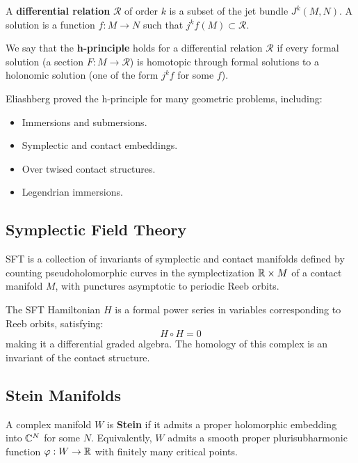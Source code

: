 \begin{definition}
A \textbf{differential relation} $\mathcal{R}$ of order $k$ is a subset of the jet bundle $J^k(M,N)$. A solution is a function $f: M \to N$ such that $j^k f(M) \subset \mathcal{R}$.
\end{definition}

\begin{definition}[h-Principle]
We say that the \textbf{h-principle} holds for a differential relation $\mathcal{R}$ if every formal solution (a section $F: M \to \mathcal{R}$) is homotopic through formal solutions to a holonomic solution (one of the form $j^k f$ for some $f$).
\end{definition}

Eliashberg proved the h-principle for many geometric problems, including:
\begin{itemize}
    \item Immersions and submersions.
    \item Symplectic and contact embeddings.
    \item Over twised contact structures.
    \item Legendrian immersions.
\end{itemize}

\subsection{Symplectic Field Theory}

\begin{definition}
SFT is a collection of invariants of symplectic and contact manifolds defined by counting pseudoholomorphic curves in the symplectization $\mathbb{R} \times M$ of a contact manifold $M$, with punctures asymptotic to periodic Reeb orbits.
\end{definition}

The SFT Hamiltonian $H$ is a formal power series in variables corresponding to Reeb orbits, satisfying:
\[
H \circ H = 0
\]
making it a differential graded algebra. The homology of this complex is an invariant of the contact structure.

\subsection{Stein Manifolds}

\begin{definition}
A complex manifold $W$ is \textbf{Stein} if it admits a proper holomorphic embedding into $\mathbb{C}^N$ for some $N$. Equivalently, $W$ admits a smooth proper plurisubharmonic function $\varphi: W \to \mathbb{R}$ with finitely many critical points.
\end{definition}

